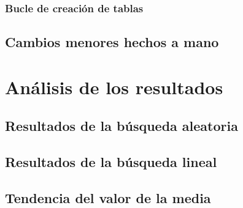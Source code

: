 \documentclass[a4paper, 11pt]{article}
\begin{document}
		\subsubsection{Bucle de creación de tablas}

	\subsection{Cambios menores hechos a mano}

\section{Análisis de los resultados}
	\subsection{Resultados de la búsqueda aleatoria}
	\subsection{Resultados de la búsqueda lineal}
	\subsection{Tendencia del valor de la media}
\end{document}
